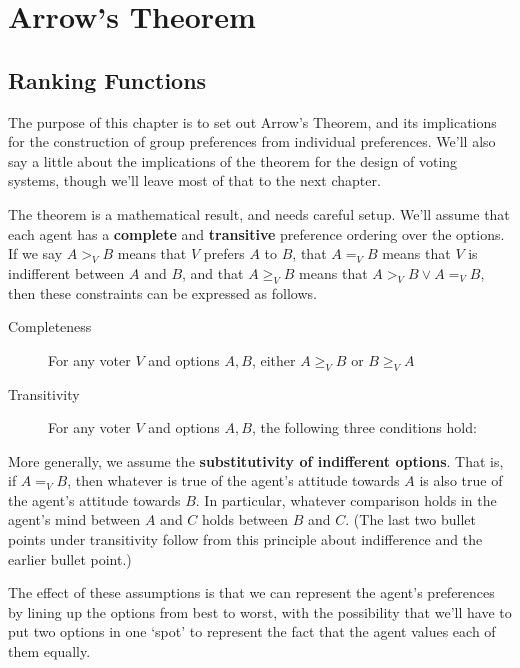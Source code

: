 \chapter{Arrow's Theorem}

\section{Ranking Functions}
The purpose of this chapter is to set out Arrow's Theorem, and its implications for the construction of group preferences from individual preferences. We'll also say a little about the implications of the theorem for the design of voting systems, though we'll leave most of that to the next chapter.

The theorem is a mathematical result, and needs careful setup. We'll assume that each agent has a \textbf{complete} and \textbf{transitive} preference ordering over the options. If we say $A >_V B$ means that $V$ prefers $A$ to $B$, that $A =_V B$ means that $V$ is indifferent between $A$ and $B$, and that $A \geq_V B$ means that $A >_V B \vee A =_V B$, then these constraints can be expressed as follows.

\begin{description}
\item[Completeness] For any voter $V$ and options $A, B$, either $A \geq_V B$ or $B \geq_V A$
\item[Transitivity] For any voter $V$ and options $A, B$, the following three conditions hold:
\end{description}

\noindent More generally, we assume the \textbf{substitutivity of indifferent options}. That is, if $A =_V B$, then whatever is true of the agent's attitude towards $A$ is also true of the agent's attitude towards $B$. In particular, whatever comparison holds in the agent's mind between $A$ and $C$ holds between $B$ and $C$. (The last two bullet points under transitivity follow from this principle about indifference and the earlier bullet point.)

The effect of these assumptions is that we can represent the agent's preferences by lining up the options from best to worst, with the possibility that we'll have to put two options in one `spot' to represent the fact that the agent values each of them equally.


